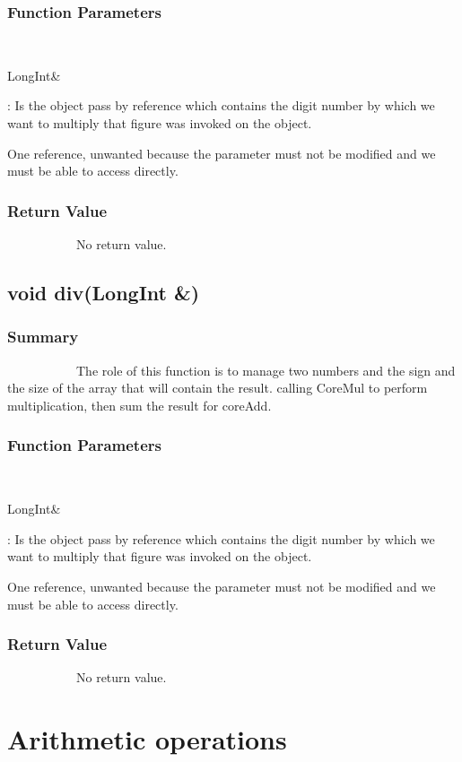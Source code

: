 \documentclass[11pt]{report}
\begin{document}
	\subsection{Function Parameters}
~~~~~~~~~~~\begin{bf}LongInt\&\end{bf}: Is the object pass by reference which contains the digit number by which
we want to multiply that figure was invoked on the object.

One reference, unwanted because the parameter must not be modified and
we must be able to access directly.

\subsection{Return Value}
~~~~~~~~~~~No return value.

\section{void div(LongInt \&)}
	\subsection{Summary}
~~~~~~~~~~~The role of this function is to manage two numbers and
the sign and the size of the array that will contain the result.
calling CoreMul to perform multiplication, then sum the result for coreAdd.
	\subsection{Function Parameters}
~~~~~~~~~~~\begin{bf}LongInt\&\end{bf}: Is the object pass by reference which contains the digit number by which
we want to multiply that figure was invoked on the object.

One reference, unwanted because the parameter must not be modified and
we must be able to access directly.

\subsection{Return Value}
~~~~~~~~~~~No return value.

    \chapter*{Arithmetic operations}  
\end{document}
